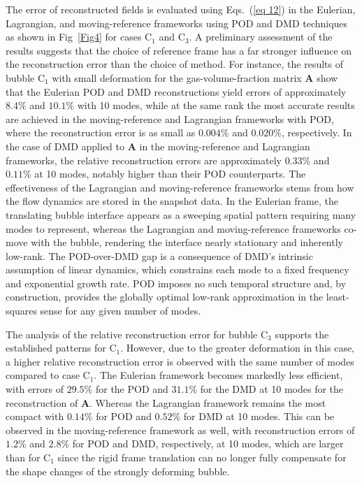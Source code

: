 \documentclass[a4paper,fleqn]{cas-sc}
\begin{document}
	The error of reconstructed fields is evaluated using Eqs.~(\ref{eq 12}) in the Eulerian, Lagrangian, and moving-reference frameworks using POD and DMD techniques as shown in Fig~\ref{Fig4} for cases C$_1$ and C$_3$. A preliminary assessment of the results suggests that the choice of reference frame has a far stronger influence on the reconstruction error than the choice of method. For instance, the results of bubble C$_1$ with small deformation for the gas-volume-fraction matrix $\mathbf{A}$ show that the Eulerian POD and DMD reconstructions yield errors of approximately $8.4\%$ and $10.1\%$ with 10 modes, while at the same rank the most accurate results are achieved in the moving-reference and Lagrangian frameworks with POD, where the reconstruction error is as small as $0.004\%$ and $0.020\%$, respectively. In the case of DMD applied to $\mathbf{A}$ in the moving-reference and Lagrangian frameworks, the relative reconstruction errors are approximately $0.33\%$ and $0.11\%$ at 10 modes, notably higher than their POD counterparts. The effectiveness of the Lagrangian and moving-reference frameworks stems from how the flow dynamics are stored in the snapshot data. In the Eulerian frame, the translating bubble interface appears as a sweeping spatial pattern requiring many modes to represent, whereas the Lagrangian and moving-reference frameworks co-move with the bubble, rendering the interface nearly stationary and inherently low-rank. The POD-over-DMD gap is a consequence of DMD's intrinsic assumption of linear dynamics, which constrains each mode to a fixed frequency and exponential growth rate. POD imposes no such temporal structure and, by construction, provides the globally optimal low-rank approximation in the least-squares sense for any given number of modes.
	
	The analysis of the relative reconstruction error for bubble C$_3$ supports the established patterns for C$_1$. However, due to the greater deformation in this case, a higher relative reconstruction error is observed with the same number of modes compared to case C$_1$. The Eulerian framework becomes markedly less efficient, with errors of $29.5\%$ for the POD and $31.1\%$ for the DMD at 10 modes for the reconstruction of $\mathbf{A}$. Whereas the Lagrangian framework remains the most compact with $0.14\%$ for POD and $0.52\%$ for DMD at 10 modes. This can be observed in the moving-reference framework as well, with reconstruction errors of $1.2\%$ and $2.8\%$ for POD and DMD, respectively, at 10 modes, which are larger than for C$_1$ since the rigid frame translation can no longer fully compensate for the shape changes of the strongly deforming bubble.
	
\end{document}
